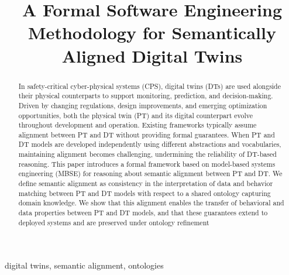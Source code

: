 \documentclass[10pt,conference, ]{IEEEtran}
\theoremstyle{definition}
\theoremstyle{plain}
\theoremstyle{remark}
\begin{document}
\title{A Formal Software Engineering Methodology for Semantically Aligned Digital Twins\\
}


\author{
	

	}



\maketitle

\begin{abstract}
In safety-critical cyber-physical systems (CPS), digital twins (DTs) are used alongside their physical counterparts to support monitoring, prediction, and decision-making. Driven by changing regulations, design improvements, and emerging optimization opportunities, both the physical twin (PT) and its digital counterpart evolve throughout development and operation. Existing frameworks typically assume alignment between PT and DT without providing formal guarantees. When PT and DT models are developed independently using different abstractions and vocabularies, maintaining alignment becomes challenging, undermining the reliability of DT-based reasoning.
This paper introduces a formal framework based on model-based systems engineering (MBSE) for reasoning about semantic alignment between PT and DT. We define semantic alignment as consistency in the interpretation of data and behavior matching between PT and DT models with respect to a shared ontology capturing domain knowledge. We show that this alignment enables the transfer of behavioral and data properties between PT and DT models, and that these guarantees extend to deployed systems and are preserved under ontology refinement
\end{abstract}

\begin{IEEEkeywords}
digital twins, semantic alignment, ontologies 
\end{IEEEkeywords}










\end{document}
